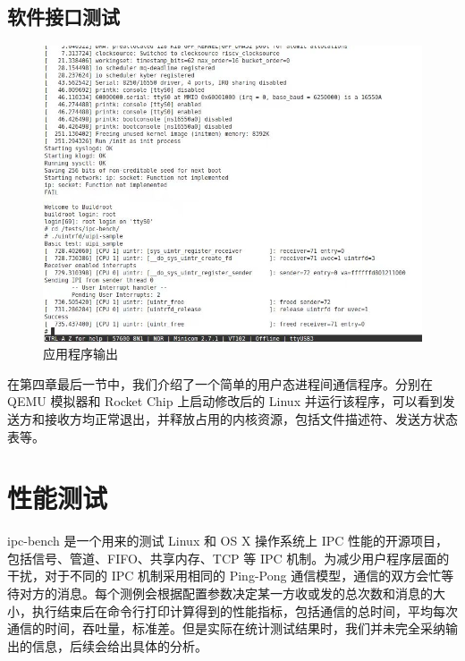 \subsection{软件接口测试}

\begin{figure}
    \centering
    \includegraphics[width=0.8\linewidth]{figures/uipi-sample.jpg}
    \caption{应用程序输出}
    \label{fig:uipi-sample}
\end{figure}

在第四章最后一节中，我们介绍了一个简单的用户态进程间通信程序。分别在 QEMU 模拟器和 Rocket Chip 上启动修改后的 Linux 并运行该程序，可以看到发送方和接收方均正常退出，并释放占用的内核资源，包括文件描述符、发送方状态表等。

\section{性能测试}

ipc-bench \cite{ipcbench} 是一个用来的测试 Linux 和 OS X 操作系统上 IPC 性能的开源项目，包括信号、管道、FIFO、共享内存、TCP 等 IPC 机制。为减少用户程序层面的干扰，对于不同的 IPC 机制采用相同的 Ping-Pong 通信模型，通信的双方会忙等待对方的消息。每个测例会根据配置参数决定某一方收或发的总次数和消息的大小，执行结束后在命令行打印计算得到的性能指标，包括通信的总时间，平均每次通信的时间，吞吐量，标准差。但是实际在统计测试结果时，我们并未完全采纳输出的信息，后续会给出具体的分析。

